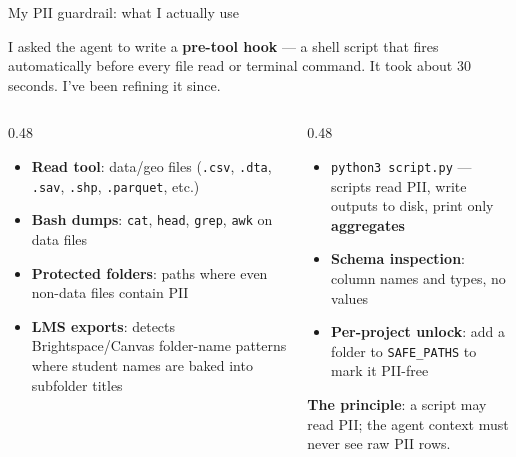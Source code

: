 \documentclass[aspectratio=169, 10pt]{beamer}
\begin{document}
\begin{frame}{My PII guardrail: what I actually use}
\vskip-4pt
\begin{tcolorbox}[accentbox, top=1pt, bottom=1pt]
\footnotesize I asked the agent to write a \textbf{pre-tool hook} --- a shell script that fires automatically before every file read or terminal command. It took about 30 seconds. I've been refining it since.
\end{tcolorbox}
\vskip2pt
\begin{columns}[T]
\begin{column}{0.48\textwidth}
\begin{tcolorbox}[pipelinebox, title={\faLock\quad What it blocks}, top=2pt, bottom=2pt]
\footnotesize
\begin{itemize}\setlength{\itemsep}{1pt}
  \item \textbf{Read tool}: data/geo files (\texttt{.csv}, \texttt{.dta}, \texttt{.sav}, \texttt{.shp}, \texttt{.parquet}, etc.)
  \item \textbf{Bash dumps}: \texttt{cat}, \texttt{head}, \texttt{grep}, \texttt{awk} on data files
  \item \textbf{Protected folders}: paths where even non-data files contain PII
  \item \textbf{LMS exports}: detects Brightspace/Canvas folder-name patterns where student names are baked into subfolder titles
\end{itemize}
\end{tcolorbox}
\end{column}
\begin{column}{0.48\textwidth}
\begin{tcolorbox}[pipelinebox, title={\faCheck\quad What it allows}, top=2pt, bottom=2pt]
\footnotesize
\begin{itemize}\setlength{\itemsep}{1pt}
  \item \texttt{python3 script.py} --- scripts read PII, write outputs to disk, print only \textbf{aggregates}
  \item \textbf{Schema inspection}: column names and types, no values
  \item \textbf{Per-project unlock}: add a folder to \texttt{SAFE\_PATHS} to mark it PII-free
\end{itemize}
\vskip3pt
\begin{tcolorbox}[accentbox, top=1pt, bottom=1pt]
\scriptsize \textbf{The principle}: a script may read PII; the agent context must never see raw PII rows.
\end{tcolorbox}
\end{tcolorbox}
\end{column}
\end{columns}
\end{frame}
\end{document}
